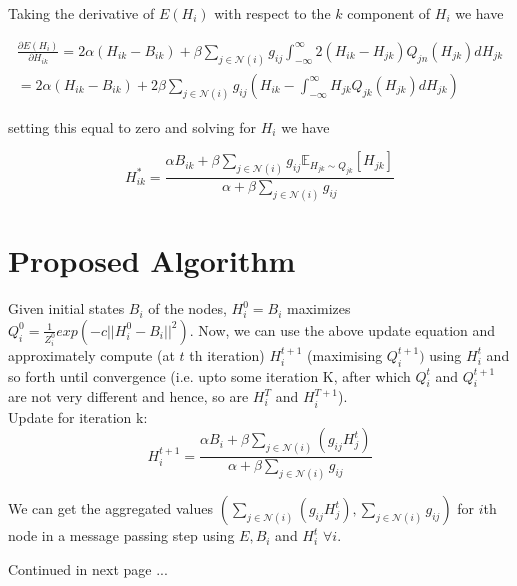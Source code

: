 Taking the derivative of $E(H_i)$ with respect to the $k$ component of $H_i$ we have

\begin{multline}
\frac{\partial E(H_i)} {\partial H_{ik}} = 2\alpha (H_{ik} - B_{ik}) + \beta \sum_{j \in \mathcal{N}(i)} g_{ij} \int_{-\infty}^{\infty} 2 (H_{ik} - H_{jk})  Q_{jn}(H_{jk}) d H_{jk} \\
= 2\alpha (H_{ik} - B_{ik}) + 2\beta \sum_{j \in \mathcal{N}(i)} g_{ij}  (H_{ik} - \int_{-\infty}^{\infty} H_{jk} Q_{jk}(H_{jk})d H_{jk})
\end{multline}

setting this equal to zero and solving for $H_i$ we have

\begin{equation}
H_{ik}^* = \frac{\alpha B_{ik} + \beta  \sum\limits_{j \in \mathcal{N}(i)} g_{ij} \mathbb{E}_{ H_{jk} \sim Q_{jk} } [H_{jk}]} {\alpha +  \beta  \sum \limits_{j \in \mathcal{N}(i)} g_{ij} }
\end{equation}
\section*{Proposed Algorithm}
Given initial states $B_i$ of the nodes, $H_i^0 = B_i$ maximizes $Q_i^0 = \frac{1}{Z_i^0}exp(-c||H_i^0 - B_i||^2)$. Now, we can use the above update equation and approximately     compute (at $t$ th iteration) $H_i^{t+1}$ (maximising $Q_i^{t+1})$ using $H_i^t$ and so forth until convergence (i.e. upto some iteration K, after which $Q_i^t$ and $Q_i^{t+1}$ are not very different and hence, so are $H_i^{T}$ and $H_i^{T+1}$).
\\
Update for iteration k:
\begin{equation}
 H_{i}^{t+1} = \frac{\alpha B_{i} + \beta  \sum\limits_{j \in \mathcal{N}(i)} (g_{ij} H_j^t)} {\alpha +  \beta  \sum \limits_{j \in \mathcal{N}(i)} g_{ij} }
\end{equation}

We can get the aggregated values $(\sum \limits_{j \in \mathcal{N}(i)} (g_{ij} H_j^t),\sum \limits_{j \in \mathcal{N}(i)} g_{ij})$ for $i$th node in a message passing step using $E, B_i$ and $H_i^t$ $\forall i$.
Continued in next page ...
\newpage
